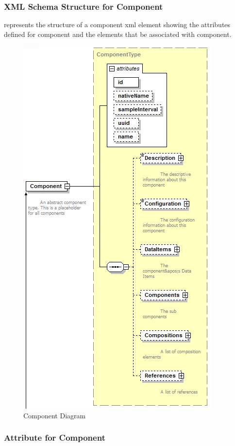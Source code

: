 

\subsubsection{XML Schema Structure for Component}
\label{sec:XML Schema Structure for Component}

 represents the structure of a \gls{component} \gls{xml} element showing the attributes defined for \gls{component} and the elements that \may be associated with \gls{component}.

\begin{figure}[ht]
  \centering
  \includegraphics[width=.6\textwidth]{figures/component-schema-diagram.png}
  \caption{Component Diagram}
  \label{fig:component-schema-diagram}
\end{figure}

\FloatBarrier

\subsubsection{Attribute for Component}

